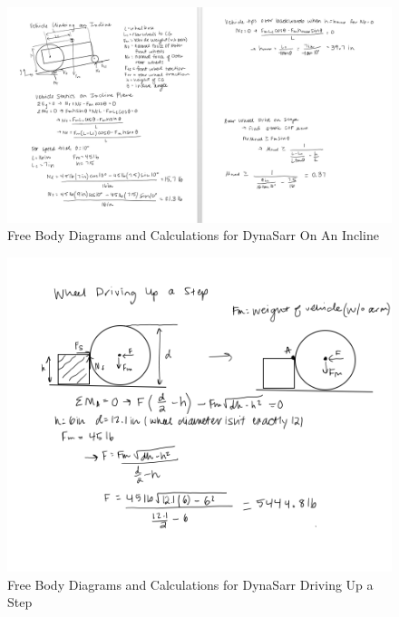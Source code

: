 \documentclass[12pt]{article}
\begin{document}
\begin{figure}[H]
    \centering
    \includegraphics[width=1.2\linewidth]{PreliminaryDesignReport/2.png}
    \caption{Free Body Diagrams and Calculations for DynaSarr On An Incline}
    \label{fig:my_label}
\end{figure}

\begin{figure}[H]
    \centering
    \includegraphics[width=1.1\linewidth]{PreliminaryDesignReport/3.png}
    \caption{Free Body Diagrams and Calculations for DynaSarr Driving Up a Step}
    \label{fig:my_label}
\end{figure}
\end{document}
